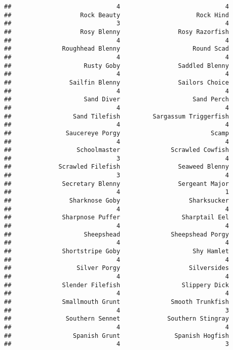 \documentclass[
]{article}
\begin{document}
\begin{verbatim}
##                             4                             4 
##                   Rock Beauty                     Rock Hind 
##                             3                             4 
##                   Rosy Blenny                Rosy Razorfish 
##                             4                             4 
##              Roughhead Blenny                    Round Scad 
##                             4                             4 
##                    Rusty Goby                Saddled Blenny 
##                             4                             4 
##                Sailfin Blenny                Sailors Choice 
##                             4                             4 
##                    Sand Diver                    Sand Perch 
##                             4                             4 
##                 Sand Tilefish         Sargassum Triggerfish 
##                             4                             4 
##               Saucereye Porgy                         Scamp 
##                             4                             4 
##                  Schoolmaster              Scrawled Cowfish 
##                             3                             4 
##             Scrawled Filefish                Seaweed Blenny 
##                             3                             4 
##              Secretary Blenny                Sergeant Major 
##                             4                             1 
##                Sharknose Goby                   Sharksucker 
##                             4                             4 
##              Sharpnose Puffer                 Sharptail Eel 
##                             4                             4 
##                    Sheepshead              Sheepshead Porgy 
##                             4                             4 
##              Shortstripe Goby                    Shy Hamlet 
##                             4                             4 
##                  Silver Porgy                   Silversides 
##                             4                             4 
##              Slender Filefish                 Slippery Dick 
##                             4                             4 
##              Smallmouth Grunt              Smooth Trunkfish 
##                             4                             3 
##               Southern Sennet             Southern Stingray 
##                             4                             4 
##                 Spanish Grunt               Spanish Hogfish 
##                             4                             3 

\end{verbatim}
\end{document}

